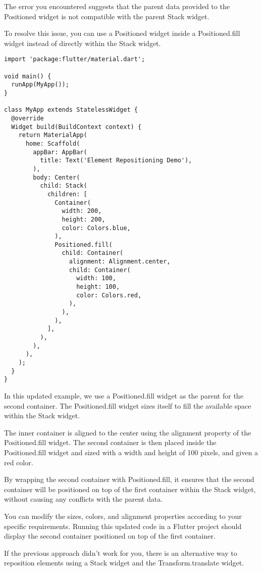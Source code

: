 The error you encountered suggests that the parent data provided to the Positioned widget is not compatible 
with the parent Stack widget.

To resolve this issue, you can use a Positioned widget inside a Positioned.fill widget instead of directly 
within the Stack widget.

\begin{lstlisting}
import 'package:flutter/material.dart';

void main() {
  runApp(MyApp());
}

class MyApp extends StatelessWidget {
  @override
  Widget build(BuildContext context) {
    return MaterialApp(
      home: Scaffold(
        appBar: AppBar(
          title: Text('Element Repositioning Demo'),
        ),
        body: Center(
          child: Stack(
            children: [
              Container(
                width: 200,
                height: 200,
                color: Colors.blue,
              ),
              Positioned.fill(
                child: Container(
                  alignment: Alignment.center,
                  child: Container(
                    width: 100,
                    height: 100,
                    color: Colors.red,
                  ),
                ),
              ),
            ],
          ),
        ),
      ),
    );
  }
}
\end{lstlisting}

In this updated example, we use a Positioned.fill widget as the parent for the second container. The Positioned.fill 
widget sizes itself to fill the available space within the Stack widget.

The inner container is aligned to the center using the alignment property of the Positioned.fill widget. 
The second container is then placed inside the Positioned.fill widget and sized with a width and height of 
100 pixels, and given a red color.

By wrapping the second container with Positioned.fill, it ensures that the second container will be positioned 
on top of the first container within the Stack widget, without causing any conflicts with the parent data.

You can modify the sizes, colors, and alignment properties according to your specific requirements. Running this 
updated code in a Flutter project should display the second container positioned on top of the first container.


If the previous approach didn't work for you, there is an alternative way to reposition elements using a Stack 
widget and the Transform.translate widget.

